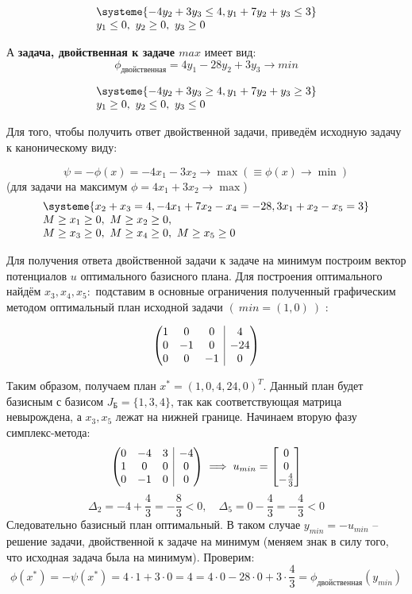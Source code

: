 \documentclass[11pt]{article}
\makeatletter
\newenvironment{amatrix}[1]{%
  \left(\begin{array}{@{}*{#1}{c}|c@{}}
}{%
  \end{array}\right)
}
\makeatother
\begin{document}
$$
\begin{array}{l}
\systeme{  -4y_2 + 3y_3 \leq 4, y_1 + 7y_2 + y_3 \leq 3}\\
y_1 \leq 0,\ y_2 \geq 0, \ y_3 \geq 0
\end{array}
$$

А \textbf{задача, двойственная к задаче $max$}  имеет вид:
$$\phi_{\text{двойственная}} = 4y_1 -28y_2 + 3y_3 \rightarrow{} min$$

$$
\begin{array}{l}
\systeme{  -4y_2 + 3y_3 \geq 4, y_1 + 7y_2 + y_3 \geq 3}\\
y_1 \geq 0,\ y_2 \leq 0, \ y_3 \leq 0
\end{array}
$$

Для того, чтобы получить ответ двойственной задачи,
приведём исходную задачу к каноническому виду:

$$
	\psi = -\phi(x) = - 4x_1 - 3x_2 \rightarrow \max{}
	\left(\equiv \phi(x) \rightarrow \min{}\right)
$$
(для задачи на максимум $\phi = 4x_1 + 3x_2 
\rightarrow \max{}$)
$$
\begin{array}{l}
\systeme{  x_2 + x_3 = 4, 
-4x_1 + 7x_2 - x_4 = - 28, 
 3x_1 + x_2 - x_5 = 3}\\
M \geq x_1 \geq 0,\ M \geq x_2 \geq 0,\\
M \geq x_3 \geq 0,\ M \geq x_4 \geq 0,\   
M \geq x_5 \geq 0
\end{array}
$$

Для получения ответа двойственной задачи к
задаче на минимум
построим вектор потенциалов $u$ оптимального
базисного плана. Для построения оптимального
найдём $x_3, x_4, x_5$:\  подставим в основные
ограничения полученный графическим методом
оптимальный план исходной задачи $(\ min = (1, 0)\ )$ :

$$\begin{amatrix}{3}
	1 &	0 & 0 & 4 \\
	0 & -1 & 0 & -24 \\
	0 & 0 & -1 & 0
\end{amatrix}$$

Таким образом, получаем план $x^* = (1, 0, 4, 24, 0)^T$. 
Данный план будет базисным с базисом $J_{\text{Б}}=\{1, 3, 4\}$, 
так 
как соответствующая матрица невырождена, а $x_3, x_5$ лежат
на нижней границе. Начинаем вторую фазу симплекс-метода:
$$\begin{amatrix}{3}
	0 &	-4 & 3 & -4 \\
	1 & 0 & 0 & 0 \\
	0 & -1 & 0 & 0
\end{amatrix} \implies
u_{min} = \begin{bmatrix}
	0\\0\\-\frac43
\end{bmatrix}
$$
$$
\Delta_2 = -4 + \frac43 = -\frac{8}3 < 0, \quad
\Delta_5 =  0 - \frac43 = -\frac43 < 0
$$
Следовательно базисный план оптимальный. В таком
случае $y_{min} = -u_{min}$ -- решение задачи, 
двойственной к задаче на минимум (меняем знак 
в силу того, что исходная задача была на
минимум). Проверим:
$$
	\phi(x^*) = -\psi(x^*) = 4\cdot{1} + 3\cdot{0} = 
	4 = 4\cdot{0} - 28\cdot{0} + 
	3\cdot{\frac43} =
	\phi_{двойственная}(y_{min})
$$
\end{document}
